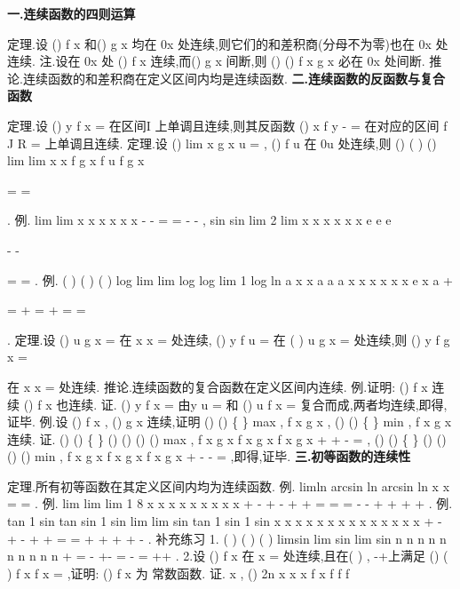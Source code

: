 \vspace{4pt}
{\bfseries \textcolor{lyred}{一.连续函数的四则运算}}

\textcolor{lyred}{定理}.设
()
f x 和()
g x 均在
0x 处连续,则它们的和差积商(分母不为零)也在
0x 处 
连续. 
\textcolor{lyred}{注}.设在
0x 处
()
f x 连续,而()
g x 间断,则
()
()
f x
g x
\pm 
必在
0x 处间断. 
\textcolor{lyred}{推论}.连续函数的和差积商在定义区间内均是连续函数. 
\vspace{4pt}
{\bfseries \textcolor{lyred}{二.连续函数的反函数与复合函数}}

\textcolor{lyred}{定理}.设
()
y
f x
=
在区间I 上单调且连续,则其反函数
()
x
f
y
-
=
在对应的区间 
f
J
R
=
上单调且连续. 
\textcolor{lyred}{定理}.设
()
lim
x
g x
u
\to 
=
\Omega 
,
()
f u 在
0u 处连续,则
()
(
)
()
lim
lim
x
x
f
g x
f u
f
g x
\to 
\to 


=
=






\Omega 
\Omega 
. 
\textcolor{lyred}{例}.
lim
lim
x
x
x
x
x
x
\to 
\to 
-
-
=
=
-
-
,
sin
sin
lim 2
lim
x
x
x
x
x
x
e
e
e
\to 


-
-




\to 
=
=
. 
\textcolor{lyred}{例}.
(
)
(
)
(
)
log
lim
lim log
log
lim 1
log
ln
a
x
x
a
a
a
x
x
x
x
x
x
e
x
a
\to 
\to 
\to 
+




=
+
=
+
=
=








. 
\textcolor{lyred}{定理}.设
()
u
g x
=
在
x
x
=
处连续,
()
y
f u
=
在
(
)
u
g x
=
处连续,则
()
y
f
g x
=



 
在
x
x
=
处连续. 
\textcolor{lyred}{推论}.连续函数的复合函数在定义区间内连续. 
\textcolor{lyred}{例}.证明:
()
f x 连续
()
f x
\Rightarrow 
也连续. 
证.
()
y
f x
=
由y
u
=
和
()
u
f x
=
复合而成,两者均连续,即得,证毕. 
\textcolor{lyred}{例}.设
()
f x , ()
g x 连续,证明
()
()
\{
\}
max
,
f x
g x
,
()
()
\{
\}
min
,
f x
g x
连续. 
证.
()
()
\{
\}
()
()
()
()
max
,
f x
g x
f x
g x
f x
g x
+
+
-
=
, 
()
()
\{
\}
()
()
()
()
min
,
f x
g x
f x
g x
f x
g x
+
-
-
=
,即得,证毕. 
\vspace{4pt}
{\bfseries \textcolor{lyred}{三.初等函数的连续性}}

\textcolor{lyred}{定理}.所有初等函数在其定义区间内均为连续函数. 
\textcolor{lyred}{例}.
limln arcsin
ln arcsin
ln
x
x
\pi 
\to 
=
=
. 
\textcolor{lyred}{例}.
lim
lim
lim
1 8
x
x
x
x
x
x
x
x
x
\to 
\to 
\to 
+
-
+
-
+
+
=
=
\cdots 
=
-
-
+
+
+
+
. 
\textcolor{lyred}{例}.
tan
1 sin
tan
sin
1 sin
lim
lim
sin
tan
1 sin
1 sin
x
x
x
x
x
x
x
x
x
x
x
x
x
x
\to 
\to 
+
-
+
-
+
+
=
=
+
+
+
+
-
. 
\textcolor{lyred}{补充练习 }
1.
(
)
(
)
(
)
limsin
lim
sin
lim
sin
n
n
n
n
n
n
n
n
n
n
\pi 
\pi 
\pi 
\to \infty 
\to \infty 
\to \infty 
+
=
-
+-
=
-
=
++
. 
2.设
()
f x 在
x =
处连续,且在(
)
,
-\infty +\infty 上满足
()
(
)
f x
f
x
=
,证明:
()
f x 为 
常数函数. 
证.
x
\forall ,
()
2n
x
x
x
f x
f
f
f






